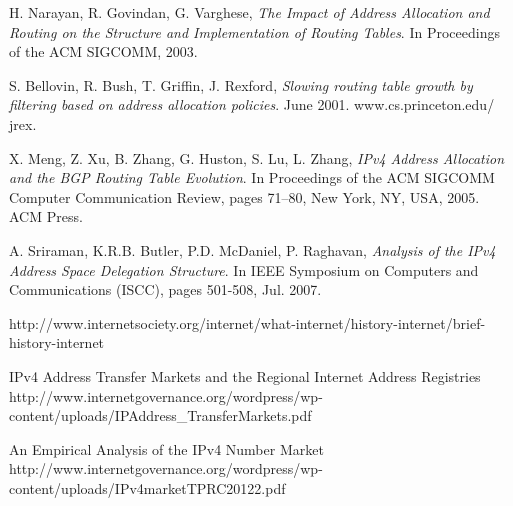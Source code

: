 \documentclass[11pt,a4paper]{scrreprt}
\begin{document}
\begin{thebibliography}{count}
	H. Narayan, R. Govindan, G. Varghese,
	\emph{The Impact of Address Allocation and Routing on the Structure and Implementation of Routing Tables}.
	In Proceedings of the ACM SIGCOMM, 2003.
	
	S. Bellovin, R. Bush, T. Griffin, J. Rexford,
	\emph{Slowing routing table growth by filtering based on address allocation policies}.
	June 2001. www.cs.princeton.edu/ jrex.

	X. Meng, Z. Xu, B. Zhang, G. Huston, S. Lu, L. Zhang,
	\emph{IPv4 Address Allocation and the BGP Routing Table Evolution}.
	In Proceedings of the ACM SIGCOMM Computer Communication Review, pages 71–80, New York, NY, USA, 2005. ACM Press.

	A. Sriraman, K.R.B. Butler, P.D. McDaniel, P. Raghavan,
	\emph{Analysis of the IPv4 Address Space Delegation Structure}.
	In IEEE Symposium on Computers and Communications (ISCC), pages 501-508, Jul. 2007.
	
	http://www.internetsociety.org/internet/what-internet/history-internet/brief-history-internet
	
	IPv4 Address Transfer Markets and the Regional Internet Address Registries http://www.internetgovernance.org/wordpress/wp-content/uploads/IPAddress\_TransferMarkets.pdf
	
	An Empirical Analysis of the IPv4 Number Market http://www.internetgovernance.org/wordpress/wp-content/uploads/IPv4marketTPRC20122.pdf
	
\end{thebibliography}	
\end{document}

